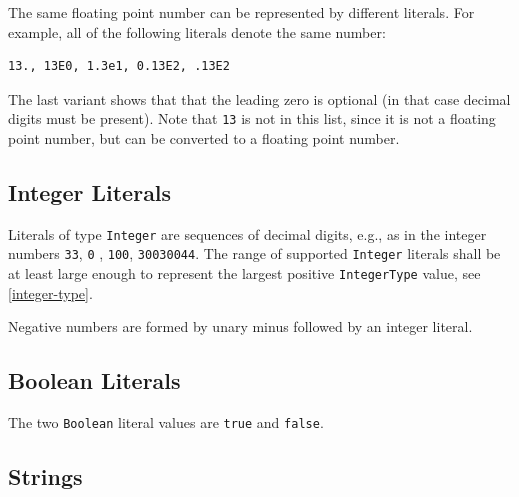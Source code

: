 The same floating point number can be represented by different literals.
For example, all of the following literals denote the same number:
\begin{lstlisting}[language=modelica]
13., 13E0, 1.3e1, 0.13E2, .13E2
\end{lstlisting}
The last variant shows that that the leading zero is optional (in that case decimal digits must be present).
Note that \lstinline!13! is not in this list, since it is not a floating point number, but can be converted to a floating point number.


\subsection{Integer Literals}\label{integer-literals}

Literals of type \lstinline!Integer! are sequences of decimal digits, e.g., as in the integer numbers \lstinline!33!,
\ifpdf
\lstinline!0!%
%
\fi
, \lstinline!100!, \lstinline!30030044!.
The range of supported \lstinline!Integer! literals shall be at least large enough to represent the largest positive \lstinline!IntegerType! value, see \cref{integer-type}.

\begin{nonnormative}
Negative numbers are formed by unary minus followed by an integer literal.
\end{nonnormative}


\subsection{Boolean Literals}\label{boolean-literals}

The two \lstinline!Boolean! literal values are \lstinline!true! and \lstinline!false!.


\subsection{Strings}\label{strings}

